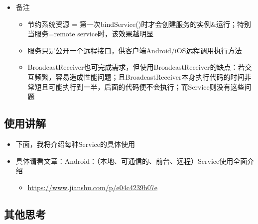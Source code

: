 \documentclass[9pt, b5paper]{article}
\begin{document}
\begin{itemize}
\item 备注
\begin{itemize}
\item 节约系统资源 = 第一次bindService()时才会创建服务的实例\&运行；特别当服务=remote service时，该效果越明显
\item 服务只是公开一个远程接口，供客户端Android/iOS远程调用执行方法
\item BroadcastReceiver也可完成需求，但使用BroadcastReceiver的缺点：若交互频繁，容易造成性能问题；且BroadcastReceiver本身执行代码的时间非常短且可能执行到一半，后面的代码便不会执行；而Service则没有这些问题
\end{itemize}
\end{itemize}
\subsection{使用讲解}
\label{sec-2-6}
\begin{itemize}
\item 下面，我将介绍每种Service的具体使用
\item 具体请看文章：Android：（本地、可通信的、前台、远程）Service使用全面介绍
\begin{itemize}
\item \url{https://www.jianshu.com/p/e04c4239b07e}
\end{itemize}
\end{itemize}
\subsection{其他思考}
\label{sec-2-7}
\end{document}
